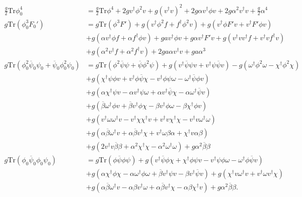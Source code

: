 \begin{align*}
	\frac{g}{2} \mathrm{Tr} \phi_0^4 &= 
	\frac{g}{2}\mathrm{Tr}\phi^4 
	+ 2 g v^\dagger \phi^2 v + g (v^\dagger v)^2 
	+ 2g \alpha v^\dagger \phi v + 2g \alpha^2 v^\dagger v	
	+ \frac{g}{2} \alpha^4
	\\
	g \mathrm{Tr}(\phi_0^3 F_0') &= 
	g \mathrm{Tr}(\phi^3 F') 
	+ g (v^\dagger \phi^2 f + f^\dagger \phi^2 v) 
	+ g (v^\dagger \phi F' v + v^\dagger F' \phi v) 
	\\
	&+ g (\alpha v^\dagger \phi f + \alpha f^\dagger \phi v) 
	+ g a v^\dagger \phi v + g \alpha v^\dagger F' v
	+ g (v^\dagger v v^\dagger f + v^\dagger v f^\dagger v)
	\\
	&+ g(\alpha^2 v^\dagger f + \alpha^2 f^\dagger v) 
	+ 2 g a \alpha v^\dagger v + g a \alpha^3
	\\
	g \mathrm{Tr}(\phi_0^2 \overline{\psi}_0 \psi_0 
	+ \overline{\psi}_0\phi_0^2 \psi_0) 
	&=g \mathrm{Tr}(\phi^2 \overline{\psi} \psi 
	+ \overline{\psi} \phi^2 \psi)
	+ g (v^\dagger \overline{\psi} \psi v 
	+ v^\dagger \psi \overline{\psi} v) 
	- g (\omega^\dagger \phi^2 \omega 
	- \chi^\dagger \phi^2 \chi) 
	\\
	&+ g (\chi^\dagger \psi \phi v 
	+ v^\dagger \phi \overline{\psi} \chi 
	- v^\dagger \phi \psi \omega 
	-\omega^\dagger \overline{\psi} \phi v)
	\\
	&+ g (\alpha \chi^\dagger \psi v 
	- \alpha v^\dagger \psi \omega 
	+ \alpha v^\dagger \overline{\psi} \chi 
	- \alpha \omega^\dagger \overline{\psi} v)
    \\ 
	&+ g (\overline{\beta} \omega^\dagger \phi v 
	+ \overline{\beta} v^\dagger \phi \chi 
	- \beta v^\dagger \phi \omega 
	- \beta \chi^\dagger \phi v) 
	\\
	&+ g (v^\dagger \omega \omega^\dagger v 
	- v^\dagger \chi \chi^\dagger v 
	+ v^\dagger v \chi^\dagger \chi 
	- v^\dagger v \omega^\dagger \omega)
	\\
	&+ g (\alpha \overline{\beta} \omega^\dagger v 
	+ \alpha \overline{\beta} v^\dagger \chi 
	+ v^\dagger \omega \beta \alpha 
	+ \chi^\dagger v \alpha \beta) 
	\\
	&+ g (2 v^\dagger v \overline{\beta} \beta 
	+ \alpha^2 \chi^\dagger \chi 
	- \alpha^2 \omega^\dagger \omega) 
	+ g \alpha^2 \overline{\beta} \beta
	\\
	g \mathrm{Tr} (\phi_0 \overline{\psi}_0 \phi_0 \psi_0)
	&= g\mathrm{Tr} (\phi \overline{\psi} \phi \psi)
	+ g(v^\dagger \overline{\psi} \phi \chi
	+ \chi^\dagger \phi \psi v
	- v^\dagger \psi \phi \omega
	- \omega^\dagger \phi \overline{\psi} v) 
	\\
	&+ g(\alpha \chi^\dagger \phi \chi
	- \alpha \omega^\dagger \phi \omega
	+ \overline{\beta} v^\dagger \psi v
	- \beta v^\dagger \overline{\psi} v)
	+g (\chi^\dagger v \omega^\dagger v
	+ v^\dagger \omega v^\dagger \chi)
	\\
	&+ g(\alpha \overline{\beta} \omega^\dagger v
	-\alpha \beta v^\dagger \omega
	+ \alpha \overline{\beta} v^\dagger \chi
	- \alpha \beta \chi^\dagger v)
	+ g \alpha^2 \overline{\beta}\beta. 
\end{align*}
